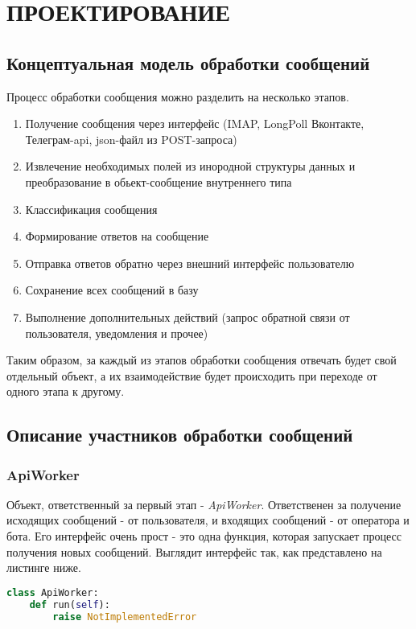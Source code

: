\section{ПРОЕКТИРОВАНИЕ}
    \subsection{Концептуальная модель обработки сообщений}
    Процесс обработки сообщения можно разделить на несколько этапов.
    \begin{enumerate}
        \item Получение сообщения через интерфейс (IMAP, LongPoll Вконтакте, Телеграм-api, json-файл из POST-запроса)
        \item Извлечение необходимых полей из инородной структуры данных и преобразование в обьект-сообщение внутреннего типа
        \item Классификация сообщения
        \item Формирование ответов на сообщение
        \item Отправка ответов обратно через внешний интерфейс пользователю
        \item Сохранение всех сообщений в базу
        \item Выполнение дополнительных действий (запрос обратной связи от пользователя, уведомления и прочее)
    \end{enumerate}

    Таким образом, за каждый из этапов обработки сообщения отвечать будет свой отдельный объект,
    а их взаимодействие будет происходить при переходе от одного этапа к другому.
    
    \subsection{Описание участников обработки сообщений}
    \subsubsection{ApiWorker}
    Объект, ответственный за первый этап - \textit{ApiWorker}. Ответственен за получение
    исходящих сообщений - от пользователя, и входящих сообщений - от оператора и бота.
    Его интерфейс очень прост - это одна функция, которая запускает процесс получения новых сообщений.
    Выглядит интерфейс так, как представлено на листинге ниже.
\begin{lstlisting}[language=Python]
class ApiWorker:
    def run(self):
        raise NotImplementedError
\end{lstlisting}

